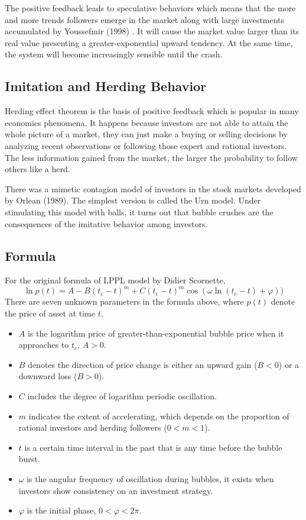 The positive feedback leads to speculative behaviors which means that the more and more trends followers emerge in the market along with large investments accumulated by Youssefmir (1998) \cite{R:3}. It will cause the market value larger than its real value presenting a greater-exponential upward tendency. At the same time, the system will become increasingly sensible until the crash.


\subsection{Imitation and Herding Behavior}
Herding effect theorem is the basis of positive feedback which is popular in many economics phenomena. It happens because investors are not able to attain the whole picture of a market, they can just make a buying or selling decisions by analyzing recent observations or following those expert and rational investors. The less information gained from the market, the larger the probability to follow others like a herd.

There was a mimetic contagion model of investors in the stock markets developed by Orlean (1989)\cite{R:4}. The simplest version is called the Urn model. Under stimulating this model with balls, it turns out that bubble crushes are the consequences of the imitative behavior among investors.


\subsection{Formula}
For the original formula of LPPL model by Didier Scornette,
\begin{equation}\label{F:lPPL}
\ln p(t) = A − B(t_c − t)^m + C(t_c − t)^m\cos(\omega\ln(t_c − t) + \varphi))
\end{equation}
There are seven unknown parameters in the formula above, where $p(t)$ denote the price of asset at time $t$,
\begin{itemize}
    \item $A$ is the logarithm price of greater-than-exponential bubble price when it approaches to $t_c$, $A > 0$.
    \item $B$ denotes the direction of price change is either an upward gain ($B < 0$) or a downward loss ($B > 0$).
    \item $C$ includes the degree of logarithm periodic oscillation.
    \item $m$ indicates the extent of accelerating, which depends on the proportion of rational investors and herding followers ($0 < m < 1$).
    \item $t$ is a certain time interval in the past that is any time before the bubble burst.
    \item $\omega$ is the angular frequency of oscillation during bubbles, it exists when investors show consistency on an investment strategy.
    \item $\varphi$ is the initial phase, $0 < \varphi < 2\pi$.
\end{itemize}

